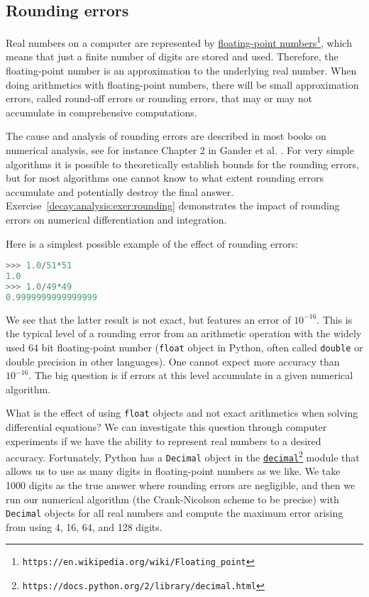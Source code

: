 \documentclass[graybox,sectrefs,envcountresetchap,open=right,final]{svmonodo}
\begin{document}
\subsection{Rounding errors}

Real numbers on a computer are represented by \href{{https://en.wikipedia.org/wiki/Floating_point}}{floating-point
numbers}\footnote{\texttt{https://en.wikipedia.org/wiki/Floating\_point}}, which means
that just a finite number of digits are stored and used. Therefore,
the floating-point number is an approximation to the underlying real
number. When doing arithmetics with floating-point numbers, there will
be small approximation errors, called round-off errors or rounding
errors, that may or may not accumulate in comprehensive computations.

The cause and analysis of rounding errors are described in most books
on numerical analysis, see for instance Chapter 2 in Gander et
al. \cite{Gander_2015}. For very simple algorithms it is possible to
theoretically establish bounds for the rounding errors, but for most
algorithms one cannot know to what extent rounding errors accumulate
and potentially destroy the final answer. Exercise~\ref{decay:analysis:exer:rounding} demonstrates the impact of rounding
errors on numerical differentiation and integration.

Here is a simplest possible example of the effect of rounding
errors:






\begin{lstlisting}[language=python,style=blue1_bluegreen]
>>> 1.0/51*51
1.0
>>> 1.0/49*49
0.9999999999999999

\end{lstlisting}

We see that the latter result is not exact, but features an error of
$10^{-16}$. This is the typical level of a rounding error from an
arithmetic operation with the widely used 64 bit floating-point number
(\texttt{float} object in Python, often called \texttt{double} or double precision
in other languages). One cannot expect more accuracy than $10^{-16}$.
The big question is if errors at this level accumulate in a given
numerical algorithm.

What is the effect of using \texttt{float} objects and not exact arithmetics
when solving differential equations? We can investigate this question
through computer experiments if we have the ability to represent real
numbers to a desired accuracy. Fortunately, Python has a \texttt{Decimal}
object in the \href{{https://docs.python.org/2/library/decimal.html}}{\nolinkurl{decimal}\footnote{\texttt{https://docs.python.org/2/library/decimal.html}}} module that allows us
to use as many digits in floating-point numbers as we like. We take
1000 digits as the true answer where rounding errors are negligible,
and then we run our numerical algorithm (the Crank-Nicolson scheme to
be precise) with \texttt{Decimal} objects for all real numbers and compute
the maximum error arising from using 4, 16, 64, and 128 digits.
\end{document}
